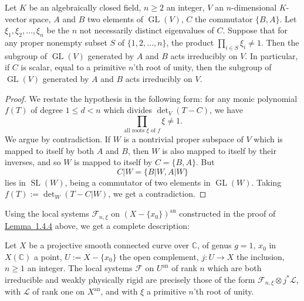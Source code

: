 \setcounter{theorem}{4}
\begin{lemma}
\label{lem:1.4.5}
Let \(K\) be an algebraically closed field, \(n\geq 2\) an integer, \(V\) an
\(n\)-dimensional \(K\)-vector space, \(A\) and \(B\) two elements of
\(\operatorname{GL}(V)\), \(C\) the commutator \(\{B,A\}\). Let
\(\xi_1,\xi_2,\ldots,\xi_n\) be the \(n\) not necessarily distinct eigenvalues
of \(C\). Suppose that for any proper nonempty subset \(S\) of
\(\{1,2,\ldots,n\}\), the product \(\prod_{i\in S}\xi_i\neq 1\). Then the
subgroup of \(\operatorname{GL}(V)\) generated by \(A\) and \(B\) acts
irreducibly on \(V\). In particular, if \(C\) is scalar, equal to a primitive
\(n\)'th root of unity, then the subgroup of \(\operatorname{GL}(V)\) generated
by \(A\) and \(B\) acts irreducibly on \(V\).
\end{lemma}

\begin{proof}
We restate the hypothesis in the following form: for any monic polynomial
\(f(T)\) of degree \(1\leq d<n\) which divides \(\det_V(T-C)\), we have
\[
  \prod_{\text{all roots }\xi\text{ of }f}\xi\neq 1.
\]
We argue by contradiction. If \(W\) is a nontrivial proper subspace of \(V\)
which is mapped to itself by both \(A\) and \(B\), then \(W\) is also mapped to
itself by their inverses, and so \(W\) is mapped to itself by
\(C=\{B,A\}\). But
\[
  C\vert W=\{B\vert W,A\vert W\}
\]
lies in \(\operatorname{SL}(W)\), being a commutator of two elements in
\(\operatorname{GL}(W)\). Taking \(f(T):=\det_W(T-C\vert W)\), we get a
contradiction.
\end{proof}

Using the local systems \(\mathcal{F}_{n,\xi}\) on \((X-\{x_0\})^{\mathrm{an}}\)
constructed in the proof of \hyperref[lem:1.4.4]{Lemma~1.4.4} above, we get a complete description:

\setcounter{theorem}{5}
\begin{proposition}
\label{prop:1.4.6}
Let \(X\) be a projective smooth connected curve over \(\mathbb{C}\), of genus
\(g=1\), \(x_0\) in \(X(\mathbb{C})\) a point, \(U:=X-\{x_0\}\) the open
complement, \(j:U\to X\) the inclusion, \(n\geq 1\) an integer. The local
systems \(\mathcal{F}\) on \(U^{\mathrm{an}}\) of rank \(n\) which are both
irreducible and weakly physically rigid are precisely those of the form
\(\mathcal{F}_{n,\xi}\otimes j^*\mathcal{L}\), with \(\mathcal{L}\) of rank one
on \(X^{\mathrm{an}}\), and with \(\xi\) a primitive \(n\)'th root of unity.
\end{proposition}

